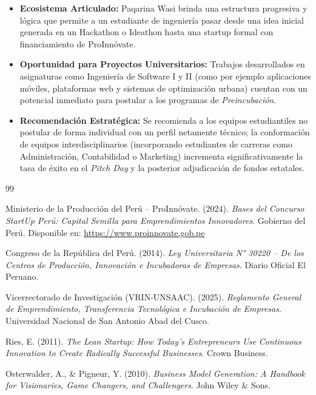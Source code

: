 ﻿\documentclass[12pt,a4paper]{article}
\begin{document}
\begin{itemize}[leftmargin=*]
    \item \textbf{Ecosistema Articulado:} Paqarina Wasi brinda una estructura progresiva y lógica que permite a un estudiante de ingeniería pasar desde una idea inicial generada en un Hackathon o Ideathon hasta una startup formal con financiamiento de ProInnóvate.
    \item \textbf{Oportunidad para Proyectos Universitarios:} Trabajos desarrollados en asignaturas como Ingeniería de Software I y II (como por ejemplo aplicaciones móviles, plataformas web y sistemas de optimización urbana) cuentan con un potencial inmediato para postular a los programas de \textit{Preincubación}.
    \item \textbf{Recomendación Estratégica:} Se recomienda a los equipos estudiantiles no postular de forma individual con un perfil netamente técnico; la conformación de equipos interdisciplinarios (incorporando estudiantes de carreras como Administración, Contabilidad o Marketing) incrementa significativamente la tasa de éxito en el \textit{Pitch Day} y la posterior adjudicación de fondos estatales.
\end{itemize}

\newpage
\begin{thebibliography}{99}

Ministerio de la Producción del Perú -- ProInnóvate. (2024). 
\textit{Bases del Concurso StartUp Perú: Capital Semilla para Emprendimientos Innovadores}. 
Gobierno del Perú. Disponible en: \url{https://www.proinnovate.gob.pe}

Congreso de la República del Perú. (2014). 
\textit{Ley Universitaria N° 30220 -- De los Centros de Producción, Innovación e Incubadoras de Empresas}. 
Diario Oficial El Peruano.

Vicerrectorado de Investigación (VRIN-UNSAAC). (2025). 
\textit{Reglamento General de Emprendimiento, Transferencia Tecnológica e Incubación de Empresas}. 
Universidad Nacional de San Antonio Abad del Cusco.

Ries, E. (2011). 
\textit{The Lean Startup: How Today's Entrepreneurs Use Continuous Innovation to Create Radically Successful Businesses}. 
Crown Business.

Osterwalder, A., \& Pigneur, Y. (2010). 
\textit{Business Model Generation: A Handbook for Visionaries, Game Changers, and Challengers}. 
John Wiley \& Sons.

\end{thebibliography}
\end{document}
